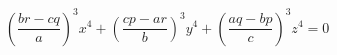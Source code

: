 \begin{proposition}\label{eq:120}
\[
    \left(\frac{br-cq}{a}\right)^3x^4+\left(\frac{cp-ar}{b}\right)^3y^4+\left(\frac{aq-bp}{c}\right)^3z^4=0
\]
\end{proposition}
